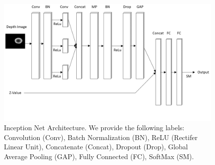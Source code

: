 \begin{figure}[t!]
    \includegraphics[width=0.99\columnwidth]{figs/inception_net.png}
\caption{Inception Net Architecture. We provide the following labels: Convolution (Conv), Batch Normalization (BN), ReLU (Rectifer Linear Unit), Concatenate (Concat), Dropout (Drop), Global Average Pooling (GAP), Fully Connected (FC), SoftMax (SM).} \label{fig:inception_net}
\end{figure}

